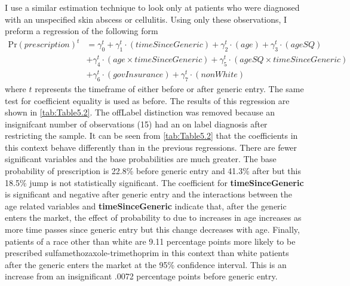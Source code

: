 \newpage
I use a similar estimation technique to look only at patients who were diagnosed with an unspecified skin abscess or cellulitis. Using only these observations, I preform a regression of the following form
\begin{equation}
\begin{split}
    \text{Pr}(prescription)^t & = \gamma^t_0 + \gamma^t_1\cdot(timeSinceGeneric)+ \gamma_2^t\cdot(age) + \gamma_3^t\cdot(ageSQ)\\
    &  + \gamma_4^t\cdot(age\times timeSinceGeneric)+ \gamma_5^t\cdot(ageSQ\times timeSinceGeneric)\\
    & + \gamma_6^t\cdot(govInsurance) + \gamma_7^t\cdot(nonWhite)
\end{split}
\end{equation}
where $t$ represents the timeframe of either before or after generic entry. The same test for coefficient equality is used as before. The results of this regression are shown in \autoref{tab:Table5.2}. The offLabel distinction was removed because an insignifcant number of observations (15) had an on label diagnosis after restricting the sample.
\indent It can be seen from \autoref{tab:Table5.2} that the coefficients in this context behave differently than in the previous regressions. There are fewer significant variables and the base probabilities are much greater. The base probability of prescription is 22.8\% before generic entry and 41.3\% after but this 18.5\% jump is not statistically significant. The coefficient for \textbf{timeSinceGeneric} is significant and negative after generic entry and the interactions between the age related variables and \textbf{timeSinceGeneric} indicate that, after the generic enters the market, the effect of probability to due to increases in age increases as more time passes since generic entry but this change decreases with age. Finally, patients of a race other than white are 9.11 percentage points more likely to be prescribed sulfamethozaxole-trimethoprim in this context than white patients after the generic enters the market at the 95\% confidence interval. This is an increase from an insignificant .0072 percentage points before generic entry.


